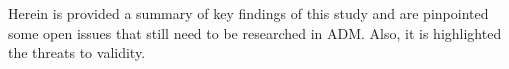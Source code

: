 Herein is provided a summary of key findings of this study and are pinpointed some open issues that still need to be researched in ADM. Also, it is highlighted the threats to validity.
